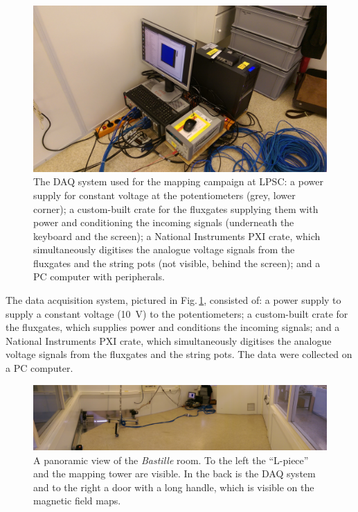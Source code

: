 
\begin{figure}
  \centering
  \includegraphics[width=\linewidth]{gfx/mapping/lpsc/daq.jpeg}
  \caption{The DAQ system used for the mapping campaign at LPSC\@: a power supply for constant voltage at the potentiometers (grey, lower corner); a custom-built crate for the fluxgates supplying them with power and conditioning the incoming signals (underneath the keyboard and the screen); a National Instruments PXI crate, which simultaneously digitises the analogue voltage signals from the fluxgates and the string pots (not visible, behind the screen); and a PC computer with peripherals.}\label{fig:mapping_bastille_daq}
\end{figure}

The data acquisition system, pictured in Fig.\,\ref{fig:mapping_bastille_daq}, consisted of: a power supply to supply a constant voltage (\SI{10}{\volt}) to the potentiometers; a custom-built crate for the fluxgates, which supplies power and conditions the incoming signals; and a National Instruments PXI crate, which simultaneously digitises the analogue voltage signals from the fluxgates and the string pots.
The data were collected on a PC computer.

\begin{figure}
  \centering
  \includegraphics[width=\linewidth]{gfx/mapping/lpsc/bastille_panorama.jpeg}
  \caption{A panoramic view of the \emph{Bastille} room.
  To the left the ``L-piece'' and the mapping tower are visible.
  In the back is the DAQ system and to the right a door with a long handle, which is visible on the magnetic field maps.}\label{fig:mapping_bastille_panorama}
\end{figure}

